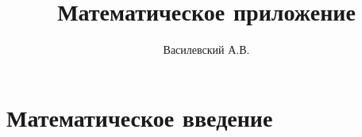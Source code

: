 \documentclass[12pt,a4paper]{article}
\title{Математическое приложение}
\author{Василевский А.В.}
\begin{document}
    \maketitle
    \tableofcontents

    \appendix

    \section{Математическое введение}


    \nocite{*}
    
    
\end{document}
